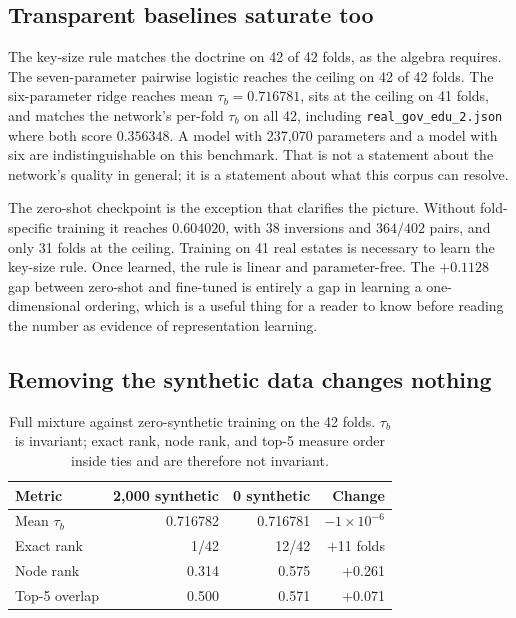\documentclass[journal,10pt]{IEEEtran}
\newcommand{\tb}{\tau_b}
\begin{document}
\subsection{Transparent baselines saturate too}

The key-size rule matches the doctrine on 42 of 42 folds, as the algebra requires. The
seven-parameter pairwise logistic reaches the ceiling on 42 of 42 folds. The six-parameter ridge
reaches mean $\tb=0.716781$, sits at the ceiling on 41 folds, and matches the network's per-fold
$\tb$ on all 42, including \texttt{real\_gov\_edu\_2.json} where both score $0.356348$. A model
with 237{,}070 parameters and a model with six are indistinguishable on this benchmark. That is not
a statement about the network's quality in general; it is a statement about what this corpus can
resolve.

The zero-shot checkpoint is the exception that clarifies the picture. Without fold-specific
training it reaches $0.604020$, with 38 inversions and $364/402$ pairs, and only 31 folds at the
ceiling. Training on 41 real estates is necessary to learn the key-size rule. Once learned, the
rule is linear and parameter-free. The $+0.1128$ gap between zero-shot and fine-tuned is entirely a
gap in learning a one-dimensional ordering, which is a useful thing for a reader to know before
reading the number as evidence of representation learning.

\subsection{Removing the synthetic data changes nothing}

\begin{table}[t]
\centering
\caption{Full mixture against zero-synthetic training on the 42 folds. $\tb$ is invariant; exact
rank, node rank, and top-5 measure order inside ties and are therefore not invariant.}
\label{tab:zerosyn}
\footnotesize
\begin{tabular}{@{}lrrr@{}}
\toprule
Metric & 2{,}000 synthetic & 0 synthetic & Change \\
\midrule
Mean $\tb$ & 0.716782 & 0.716781 & $-1\times10^{-6}$ \\
Exact rank & 1/42 & 12/42 & +11 folds \\
Node rank & 0.314 & 0.575 & +0.261 \\
Top-5 overlap & 0.500 & 0.571 & +0.071 \\
\bottomrule
\end{tabular}
\end{table}
\end{document}
